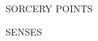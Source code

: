 \documentclass[10pt]{article}
\begin{document}
\begin{charsheet}
\def\sp{SORCERY POINTS}
\ifx\upperdndlabel\sp
  \edef\upperdndcontents{\noexpand\stackslots{\rawgetDND{SORCERY POINTS}}}%
\fi

\def\se{SENSES}
\ifx\upperdndlabel\se
  \def\upperdndcontents{\parbox{20mm}{\centering\rmfamily\small\textit{\getDND{SENSES}}}}%
\fi

%
%
%
%
%




\end{charsheet}

\clearpage
\end{document}
